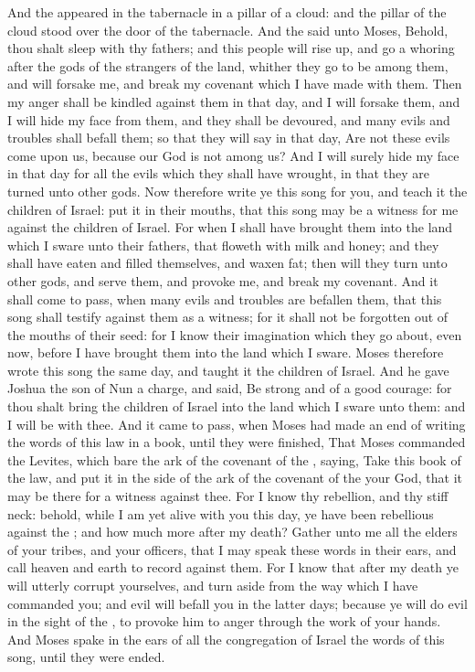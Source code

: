 \begin{biblechapter}
\verse And the \LORD appeared in the tabernacle in a pillar of a cloud: and the pillar of the cloud stood over the door of the tabernacle.
\verse And the \LORD said unto Moses, Behold, thou shalt sleep with thy fathers; and this people will rise up, and go a whoring after the gods of the strangers of the land, whither they go to be among them, and will forsake me, and break my covenant which I have made with them.
\verse Then my anger shall be kindled against them in that day, and I will forsake them, and I will hide my face from them, and they shall be devoured, and many evils and troubles shall befall them; so that they will say in that day, Are not these evils come upon us, because our God is not among us?
\verse And I will surely hide my face in that day for all the evils which they shall have wrought, in that they are turned unto other gods.
\verse Now therefore write ye this song for you, and teach it the children of Israel: put it in their mouths, that this song may be a witness for me against the children of Israel.
\verse For when I shall have brought them into the land which I sware unto their fathers, that floweth with milk and honey; and they shall have eaten and filled themselves, and waxen fat; then will they turn unto other gods, and serve them, and provoke me, and break my covenant.
\verse And it shall come to pass, when many evils and troubles are befallen them, that this song shall testify against them as a witness; for it shall not be forgotten out of the mouths of their seed: for I know their imagination which they go about, even now, before I have brought them into the land which I sware.
\verse Moses therefore wrote this song the same day, and taught it the children of Israel.
\verse And he gave Joshua the son of Nun a charge, and said, Be strong and of a good courage: for thou shalt bring the children of Israel into the land which I sware unto them: and I will be with thee.
\verse And it came to pass, when Moses had made an end of writing the words of this law in a book, until they were finished,
\verse That Moses commanded the Levites, which bare the ark of the covenant of the \LORD, saying,
\verse Take this book of the law, and put it in the side of the ark of the covenant of the \LORD your God, that it may be there for a witness against thee.
\verse For I know thy rebellion, and thy stiff neck: behold, while I am yet alive with you this day, ye have been rebellious against the \LORD; and how much more after my death?
\verse Gather unto me all the elders of your tribes, and your officers, that I may speak these words in their ears, and call heaven and earth to record against them.
\verse For I know that after my death ye will utterly corrupt yourselves, and turn aside from the way which I have commanded you; and evil will befall you in the latter days; because ye will do evil in the sight of the \LORD, to provoke him to anger through the work of your hands.
 And Moses spake in the ears of all the congregation of Israel the words of this song, until they were ended.
\end{biblechapter}

